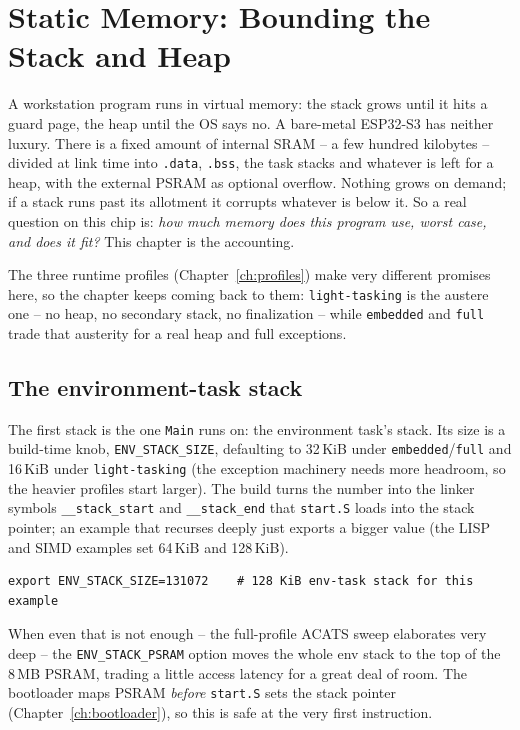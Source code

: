 \chapter{Static Memory: Bounding the Stack and Heap}
\label{ch:static-mem}

A workstation program runs in virtual memory: the stack grows until it hits a
guard page, the heap until the OS says no. A bare-metal ESP32-S3 has neither
luxury. There is a fixed amount of internal SRAM -- a few hundred kilobytes --
divided at link time into \texttt{.data}, \texttt{.bss}, the task stacks and
whatever is left for a heap, with the external PSRAM as optional overflow. Nothing
grows on demand; if a stack runs past its allotment it corrupts whatever is below
it. So a real question on this chip is: \emph{how much memory does this program
use, worst case, and does it fit?} This chapter is the accounting.

The three runtime profiles (Chapter~\ref{ch:profiles}) make very different
promises here, so the chapter keeps coming back to them: \texttt{light-tasking} is
the austere one -- no heap, no secondary stack, no finalization -- while
\texttt{embedded} and \texttt{full} trade that austerity for a real heap and full
exceptions.

\section{The environment-task stack}

The first stack is the one \texttt{Main} runs on: the environment task's stack. Its
size is a build-time knob, \texttt{ENV\_STACK\_SIZE}, defaulting to 32\,KiB under
\texttt{embedded}/\texttt{full} and 16\,KiB under \texttt{light-tasking} (the
exception machinery needs more headroom, so the heavier profiles start larger). The
build turns the number into the linker symbols \texttt{\_\_stack\_start} and
\texttt{\_\_stack\_end} that \texttt{start.S} loads into the stack pointer; an
example that recurses deeply just exports a bigger value (the LISP and SIMD examples
set 64\,KiB and 128\,KiB).

\begin{lstlisting}[style=sh]
export ENV_STACK_SIZE=131072    # 128 KiB env-task stack for this example
\end{lstlisting}

When even that is not enough -- the full-profile ACATS sweep elaborates very deep --
the \texttt{ENV\_STACK\_PSRAM} option moves the whole env stack to the top of the
8\,MB PSRAM, trading a little access latency for a great deal of room. The
bootloader maps PSRAM \emph{before} \texttt{start.S} sets the stack pointer
(Chapter~\ref{ch:bootloader}), so this is safe at the very first instruction.

